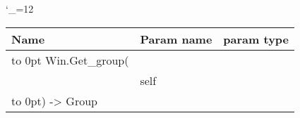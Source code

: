 \begingroup \catcode`\_=12 \tt
\begin{tabular}{lll}
\toprule
\textrm{Name}&\textrm{Param name}&\textrm{param type}\\
\midrule
\hbox to 0pt {Win.Get_group(\hss}\\
& self\\
\hbox to 0pt{) -> Group\hss}\\
\bottomrule
\end{tabular}
\endgroup
